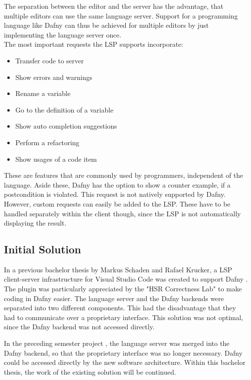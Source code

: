 The separation between the editor and the server has the advantage, that multiple editors can use the same language server.
Support for a programming language like Dafny can thus be achieved for multiple editors by just implementing the language server once.\\

The most important requests the LSP supports incorporate:
\begin{itemize}
    \item Transfer code to server
    \item Show errors and warnings
    \item Rename a variable
    \item Go to the definition of a variable
    \item Show auto completion suggestions
    \item Perform a refactoring
    \item Show usages of a code item
\end{itemize}
These are features that are commonly used by programmers, independent of the language.
Aside these, Dafny has the option to show a counter example, if a postcondition is violated.
This request is not natively supported by Dafny.
However, custom requests can easily be added to the LSP.
These have to be handled separately within the client though, since the LSP is not automatically displaying the result.


\subsection{Initial Solution}
\label{section:management_summary:initialsolution}
In a previous bachelor thesis by Markus Schaden and Rafael Krucker, a LSP client-server infrastructure for Visual Studio Code was created to support Dafny \cite{ba}.
The plugin was particularly appreciated by the "HSR Correctness Lab" \cite{correctnessLab} to make coding in Dafny easier.
The language server and the Dafny backends were separated into two different components.
This had the disadvantage that they had to communicate over a proprietary interface.
This solution was not optimal, since the Dafny backend was not accessed directly.

In the preceding semester project \cite{sa}, the language server was merged into the Dafny backend, so that the proprietary interface was no longer necessary.
Dafny could be accessed directly by the new software architecture.
Within this bachelor thesis, the work of the existing solution will be continued.


